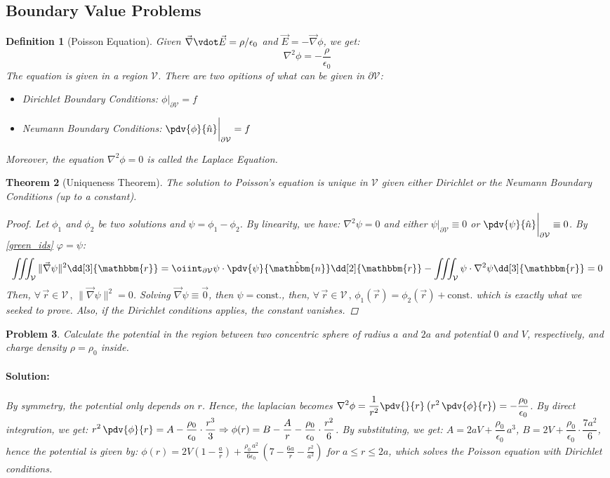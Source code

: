 \documentclass[12pt]{article}
\let\RA\Rightarrow
\renewcommand{\grad}{\vec{\nabla}}
\renewcommand{\div}{\vec{\nabla}\vdot}
\newcommand*{\lapl}{\nabla^2}
\newcommand{\Forall}[1]{\forall\,{#1}\,,\,}
\newcommand*{\rv}{\vec{r}}
\newcommand*{\ir}{\mathbbm{r}}
\newcommand*{\nhat}{\hat{\mathbbm{n}}}
\newcommand*{\vE}{\vec{E}}
\newcommand*{\ee}{\epsilon_0}
\newcommand*{\vol}{\mathcal{V}}
\newtheorem{theorem}{Theorem}[subsection]
\newtheorem{definition}[theorem]{Definition}
\newtheorem{problem}[theorem]{Problem}
\newenvironment{solution}{\paragraph{Solution:}}{\hfill}
\begin{document}
\subsection{Boundary Value Problems}

\begin{definition}[Poisson Equation]
  \label{poisson}
  Given $\div\vE=\rho/\ee$ and $\vE=-\grad\phi$, we get: $$\lapl\phi=-\frac{\rho}{\ee}$$
  The equation is given in a region $\vol$. There are two opitions of what can be given in $\partial\vol$:
  \begin{itemize}
    \item[] Dirichlet Boundary Conditions: $\phi\big|_{\partial\vol}=f$
    \item[] Neumann Boundary Conditions: $\displaystyle\pdv{\phi}{\hat{n}}\bigg|_{\partial\vol}=f$
  \end{itemize}
  Moreover, the equation $\lapl\phi=0$ is called the Laplace Equation.
\end{definition}

\begin{theorem}[Uniqueness Theorem]
  \label{uniqueness}
  The solution to Poisson's equation is unique in $\vol$ given either Dirichlet or the Neumann Boundary Conditions (up to a constant).
  \begin{proof}
    Let $\phi_1$ and $\phi_2$ be two solutions and $\psi=\phi_1-\phi_2$. By linearity, we have: $\lapl\psi=0$ and either $\psi\big|_{\partial\vol}\equiv 0$ or $\displaystyle\pdv{\psi}{\hat{n}}\bigg|_{\partial\vol}\equiv 0$. By \ref{green_ids} $\varphi=\psi$: $$\iiint_\vol \|\grad\psi\|^2\dd[3]{\ir}=\oiint_{\partial\vol}\psi\cdot\pdv{\psi}{\nhat}\dd[2]{\ir}-\iiint_\vol \psi\cdot\lapl\psi\dd[3]{\ir}=0$$ Then, $\Forall{\rv\in\vol}\|\grad\psi\|^2=0$. Solving $\grad\psi\equiv\vec{0}$, then $\psi=\text{const.}$, then, $\Forall{\rv\in\vol}\phi_1(\rv)=\phi_2(\rv)+\text{const.}$ which is exactly what we seeked to prove. Also, if the Dirichlet conditions applies, the constant vanishes.
  \end{proof}
\end{theorem}

\begin{problem}
  Calculate the potential in the region between two concentric sphere of radius $a$ and $2a$ and potential $0$ and $V$, respectively, and charge density $\rho=\rho_0$ inside.
  \begin{solution}
    By symmetry, the potential only depends on $r$. Hence, the laplacian becomes $\displaystyle\lapl\phi=\frac{1}{r^2}\pdv{}{r}\left(r^2\,\pdv{\phi}{r}\right)=-\frac{\rho_0}{\ee}$. By direct integration, we get: $\displaystyle r^2\,\pdv{\phi}{r}=A-\frac{\rho_0}{\ee}\cdot \frac{r^3}{3}\RA \phi(r)=B-\frac{A}{r}-\frac{\rho_0}{\ee}\cdot\frac{r^2}{6}$. By substituting, we get: $A=2aV+\dfrac{\rho_0}{\ee}\,a^3$, $B=2V+\dfrac{\rho_0}{\ee}\cdot\dfrac{7a^2}{6}$, hence the potential is given by: $\displaystyle\phi(r)=2V\left(1-\frac{a}{r}\right)+\frac{\rho_0\,a^2}{6\ee}\,\left(7-\frac{6a}{r}-\frac{r^2}{a^2}\right)$ for $a\leq r\leq 2a$, which solves the Poisson equation with Dirichlet conditions.
  \end{solution}
\end{problem}
\end{document}
